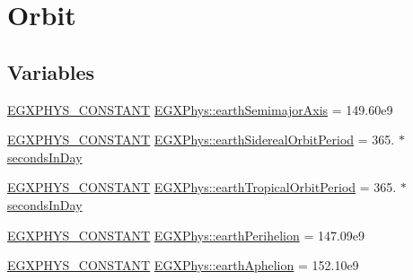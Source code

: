 \hypertarget{group___e_g_x_phys-_constants-_astrophysics-_solar_system-_earth-_orbit}{}\section{Orbit}
\label{group___e_g_x_phys-_constants-_astrophysics-_solar_system-_earth-_orbit}
\subsection*{Variables}
\begin{DoxyCompactItemize}
\item 
\mbox{\hyperlink{group___e_g_x_phys-_constants-_macros_ga76980d288494ce1714c9ac68a95ba702}{E\+G\+X\+P\+H\+Y\+S\+\_\+\+C\+O\+N\+S\+T\+A\+NT}} \mbox{\hyperlink{group___e_g_x_phys-_constants-_astrophysics-_solar_system-_earth-_orbit_ga639f4ec7fb96c7750f22bfa1bc3a91f9}{E\+G\+X\+Phys\+::earth\+Semimajor\+Axis}} = 149.\+60e9
\item 
\mbox{\hyperlink{group___e_g_x_phys-_constants-_macros_ga76980d288494ce1714c9ac68a95ba702}{E\+G\+X\+P\+H\+Y\+S\+\_\+\+C\+O\+N\+S\+T\+A\+NT}} \mbox{\hyperlink{group___e_g_x_phys-_constants-_astrophysics-_solar_system-_earth-_orbit_ga5322620bd6fa94e24b08279f65d07ea2}{E\+G\+X\+Phys\+::earth\+Sidereal\+Orbit\+Period}} = 365. $\ast$ \mbox{\hyperlink{namespace_e_g_x_phys_a93d2a00d75411b58cbf63ab3fd1f8bc2}{seconds\+In\+Day}}
\item 
\mbox{\hyperlink{group___e_g_x_phys-_constants-_macros_ga76980d288494ce1714c9ac68a95ba702}{E\+G\+X\+P\+H\+Y\+S\+\_\+\+C\+O\+N\+S\+T\+A\+NT}} \mbox{\hyperlink{group___e_g_x_phys-_constants-_astrophysics-_solar_system-_earth-_orbit_ga8bfaa9c23b81c32f1576a1fa9ee042df}{E\+G\+X\+Phys\+::earth\+Tropical\+Orbit\+Period}} = 365. $\ast$ \mbox{\hyperlink{namespace_e_g_x_phys_a93d2a00d75411b58cbf63ab3fd1f8bc2}{seconds\+In\+Day}}
\item 
\mbox{\hyperlink{group___e_g_x_phys-_constants-_macros_ga76980d288494ce1714c9ac68a95ba702}{E\+G\+X\+P\+H\+Y\+S\+\_\+\+C\+O\+N\+S\+T\+A\+NT}} \mbox{\hyperlink{group___e_g_x_phys-_constants-_astrophysics-_solar_system-_earth-_orbit_gaae650e3a5c8214f5cae21a3eba1f1593}{E\+G\+X\+Phys\+::earth\+Perihelion}} = 147.\+09e9
\item 
\mbox{\hyperlink{group___e_g_x_phys-_constants-_macros_ga76980d288494ce1714c9ac68a95ba702}{E\+G\+X\+P\+H\+Y\+S\+\_\+\+C\+O\+N\+S\+T\+A\+NT}} \mbox{\hyperlink{group___e_g_x_phys-_constants-_astrophysics-_solar_system-_earth-_orbit_ga603b731138cdd2501278fde244e35180}{E\+G\+X\+Phys\+::earth\+Aphelion}} = 152.\+10e9

\end{DoxyCompactItemize}

